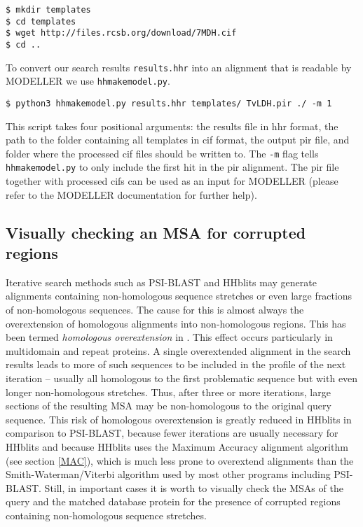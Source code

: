 \documentclass[11pt,a4paper]{article}
\begin{document}
\begin{verbatim}
$ mkdir templates
$ cd templates
$ wget http://files.rcsb.org/download/7MDH.cif 
$ cd ..
\end{verbatim}

To convert our search results \verb`results.hhr` into an alignment that is readable by MODELLER we use \verb`hhmakemodel.py`.

\begin{verbatim}
$ python3 hhmakemodel.py results.hhr templates/ TvLDH.pir ./ -m 1
\end{verbatim}

This script takes four positional arguments: the results file in hhr format, the path to the folder containing all templates in cif format, the output pir file, and folder where the processed cif files should be written to. The \verb`-m` flag tells \verb`hhmakemodel.py` to only include the first hit in the pir alignment. The pir file together with processed cifs can be used as an input for MODELLER (please refer to the MODELLER documentation for further help).

\subsection{Visually checking an MSA for corrupted regions}

Iterative search methods such as PSI-BLAST and HHblits may generate alignments containing non-homologous sequence stretches or even large fractions of non-homologous sequences. The cause for this is almost always the overextension of homologous alignments into non-homologous regions. This has been termed \emph{homologous overextension} in \cite{Gonzalez:2010}. This effect occurs particularly in multidomain and repeat proteins. A single overextended alignment in the search results leads to more of such sequences to be included in the profile of the next iteration -- usually all homologous to the first problematic sequence but with even longer non-homologous stretches. Thus, after three or more iterations, large sections of the resulting MSA may be non-homologous to the original query sequence. This risk of homologous overextension is greatly reduced in HHblits in comparison to PSI-BLAST, because fewer iterations are usually necessary for HHblits and because HHblits uses the Maximum Accuracy alignment algorithm (see section \ref{MAC}), which is much less prone to overextend alignments than the Smith-Waterman/Viterbi algorithm used by most other programs including PSI-BLAST. Still, in important cases it is worth to visually check the MSAs of the query and the matched database protein for the presence of corrupted regions containing non-homologous sequence stretches. 
\end{document}
